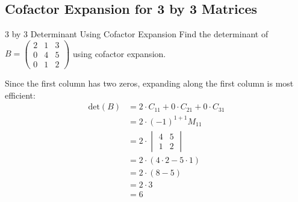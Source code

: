 \documentclass[12pt,a4paper]{article}
\newcommand{\Det}{\text{det}}
\begin{document}
	\subsection{Cofactor Expansion for 3 by 3 Matrices}
	
	\begin{example}{3 by 3 Determinant Using Cofactor Expansion}
		Find the determinant of $B = \begin{pmatrix} 2 & 1 & 3 \\ 0 & 4 & 5 \\ 0 & 1 & 2 \end{pmatrix}$ using cofactor expansion.
		
		Since the first column has two zeros, expanding along the first column is most efficient:
		\begin{align*}
			\Det(B) &= 2 \cdot C_{11} + 0 \cdot C_{21} + 0 \cdot C_{31} \\
			&= 2 \cdot (-1)^{1+1} M_{11} \\
			&= 2 \cdot \begin{vmatrix} 4 & 5 \\ 1 & 2 \end{vmatrix} \\
			&= 2 \cdot (4 \cdot 2 - 5 \cdot 1) \\
			&= 2 \cdot (8 - 5) \\
			&= 2 \cdot 3 \\
			&= 6
		\end{align*}
	\end{example}
	
\end{document}
